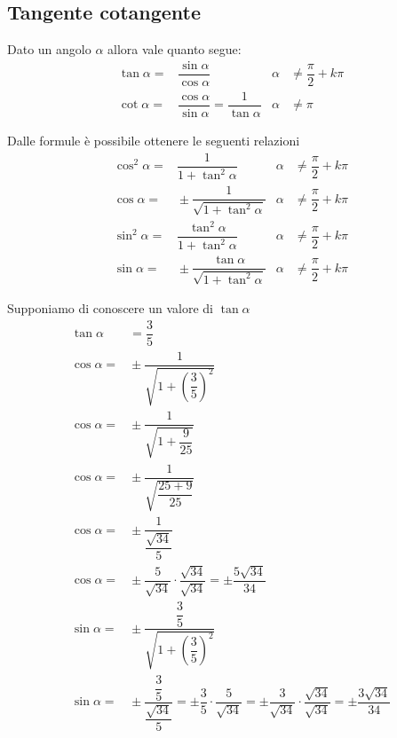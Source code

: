 \subsection{Tangente cotangente}
\label{sec:TangenteCotangente}
\begin{definizione}
	Dato un angolo $\alpha$ allora vale quanto segue:
\begin{align}
\tan\alpha=&{}\dfrac{\sin\alpha}{\cos\alpha}&\alpha&{}\neq\dfrac{\pi}{2}+k\pi\label{equ:tangente1}\\
\cot\alpha=&{}\dfrac{\cos\alpha}{\sin\alpha}={}\dfrac{1}{\tan\alpha}& \alpha&{}\neq\pi\label{equ:cotangente1}
\end{align}
\end{definizione}
Dalle formule\nobs{} è possibile ottenere le seguenti relazioni
\begin{align*}
\cos^{2}\alpha=&{}\dfrac{1}{1+{\tan}^{2}\alpha} &\alpha&{}\neq\dfrac{\pi}{2}+k\pi\\
\cos\alpha=&{}\pm\dfrac{1}{\sqrt{1+{\tan}^{2}\alpha}} &\alpha{}&\neq\dfrac{\pi}{2}+k\pi\\
\sin^{2}\alpha=&{}\dfrac{\tan^{2}\alpha}{1+\tan^{2}\alpha}&\alpha{}&\neq\dfrac{\pi}{2}+k\pi\\
\sin\alpha=&{}\pm\dfrac{\tan\alpha}{\sqrt{1+\tan^{2}\alpha}}&\alpha{}&\neq\dfrac{\pi}{2}+k\pi
\end{align*}
\begin{esempio}
Supponiamo di conoscere un valore di $\tan\alpha$
\begin{align*}
\tan\alpha&{}=\dfrac{3}{5}\\
\cos\alpha=&{}\pm\dfrac{1}{\sqrt{1+\left(\dfrac{3}{5}\right)^2}}\\
\cos\alpha=&{}\pm\dfrac{1}{\sqrt{1+\dfrac{9}{25}}}\\
\cos\alpha=&{}\pm\dfrac{1}{\sqrt{\dfrac{25+9}{25}}}\\
\cos\alpha=&{}\pm\dfrac{1}{\dfrac{\sqrt{34}}{5}}\\
\cos\alpha=&{}\pm\dfrac{5}{\sqrt{34}}\cdot\dfrac{\sqrt{34}}{\sqrt{34}}=\pm\dfrac{5\sqrt{34}}{34}\\
\sin\alpha=&{}\pm\dfrac{\dfrac{3}{5}}{\sqrt{1+\left(\dfrac{3}{5}\right)^2}}\\
\sin\alpha=&{}\pm\dfrac{\dfrac{3}{5}}{\dfrac{\sqrt{34}}{5}}=\pm\dfrac{3}{5}\cdot\dfrac{5}{\sqrt{34}}=\pm\dfrac{3}{\sqrt{34}}\cdot\dfrac{\sqrt{34}}{\sqrt{34}}=\pm\dfrac{3\sqrt{34}}{34}
\end{align*}
\end{esempio}
